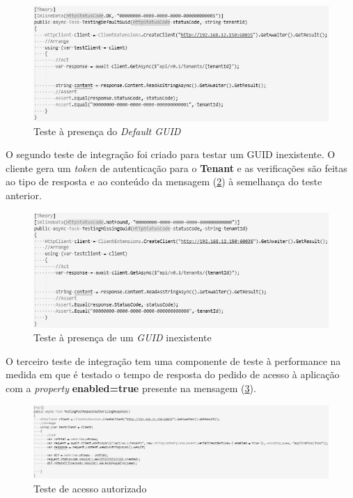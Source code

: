 \begin{figure}[hbt!]
\centering
\includegraphics[width=0.9\linewidth]{Cap6/TenantDefaultGUID.png}
\caption{Teste à presença do \textit{Default GUID}}
\label{Fig:Fig59}
\end{figure}

\hspace{1cm}O segundo teste de integração foi criado para testar um GUID inexistente. O cliente gera um \textit{token} de autenticação para o \textbf{Tenant} e as verificações são feitas ao tipo de resposta e ao conteúdo da mensagem (\ref{Fig:Fig60}) à semelhança do teste anterior.

\begin{figure}[hbt!]
\centering
\includegraphics[width=0.9\linewidth]{Cap6/TenantMissingGUID.png}
\caption{Teste à presença de um \textit{GUID} inexistente}
\label{Fig:Fig60}
\end{figure}

\hspace{1cm}O terceiro teste de integração tem uma componente de teste à performance na medida em que é testado o tempo de resposta do pedido de acesso à aplicação com a \textit{property} \textbf{enabled=true} presente na mensagem (\ref{Fig:Fig61}).

\begin{figure}[hbt!]
\centering
\includegraphics[width=0.9\linewidth]{Cap6/TenantAuthorization.png}
\caption{Teste de acesso autorizado}
\label{Fig:Fig61}
\end{figure}

